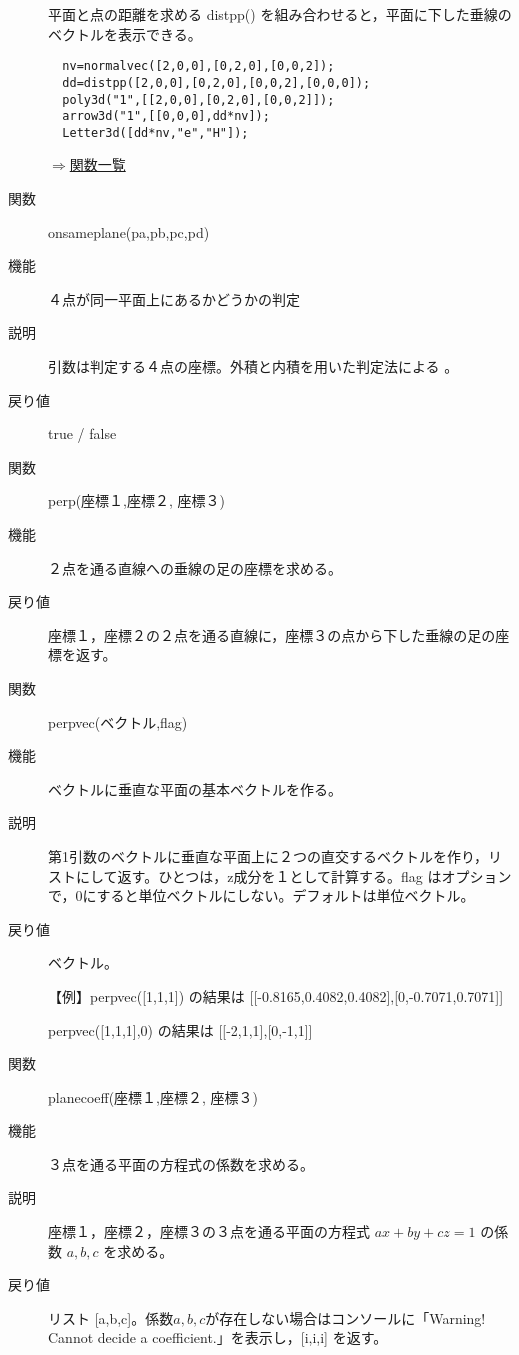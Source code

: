 \documentclass[papersize,a4paper,12pt,uplatex]{jsarticle}
\begin{document}
\begin{description}
平面と点の距離を求める distpp() を組み合わせると，平面に下した垂線のベクトルを表示できる。 
\begin{verbatim}
  nv=normalvec([2,0,0],[0,2,0],[0,0,2]); 
  dd=distpp([2,0,0],[0,2,0],[0,0,2],[0,0,0]); 
  poly3d("1",[[2,0,0],[0,2,0],[0,0,2]]); 
  arrow3d("1",[[0,0,0],dd*nv]); 
  Letter3d([dd*nv,"e","H"]); 
\end{verbatim}

   

\begin{flushright} \hyperlink{functionlist}{$\Rightarrow$関数一覧}\end{flushright}

\hypertarget{onsameplane}{}
\item[関数] onsameplane(pa,pb,pc,pd)
\item[機能] ４点が同一平面上にあるかどうかの判定
\item[説明] 引数は判定する４点の座標。外積と内積を用いた判定法による 。
\item[戻り値] true / false

\vspace{\baselineskip}
\hypertarget{perp}{}
\item[関数] perp(座標１,座標２, 座標３)
\item[機能] ２点を通る直線への垂線の足の座標を求める。
\item[戻り値]  座標１，座標２の２点を通る直線に，座標３の点から下した垂線の足の座標を返す。

\hypertarget{perpvec}{}
\item[関数] perpvec(ベクトル,flag)
\item[機能] ベクトルに垂直な平面の基本ベクトルを作る。
\item[説明] 第1引数のベクトルに垂直な平面上に２つの直交するベクトルを作り，リストにして返す。ひとつは，z成分を１として計算する。flag はオプションで，0にすると単位ベクトルにしない。デフォルトは単位ベクトル。
\item[戻り値] ベクトル。 

【例】perpvec([1,1,1]) の結果は [[-0.8165,0.4082,0.4082],[0,-0.7071,0.7071]]  

   perpvec([1,1,1],0) の結果は [[-2,1,1],[0,-1,1]]  

\vspace{\baselineskip}

\hypertarget{planecoeff}{}
\item[関数] planecoeff(座標１,座標２, 座標３)
\item[機能] ３点を通る平面の方程式の係数を求める。
\item[説明] 座標１，座標２，座標３の３点を通る平面の方程式 $ax+by+cz=1$ の係数 $a,b,c$ を求める。
\item[戻り値] リスト [a,b,c]。係数$a,b,c$が存在しない場合はコンソールに「Warning! Cannot decide a coefficient.」を表示し，[i,i,i] を返す。
 


\end{description}
\end{document}
